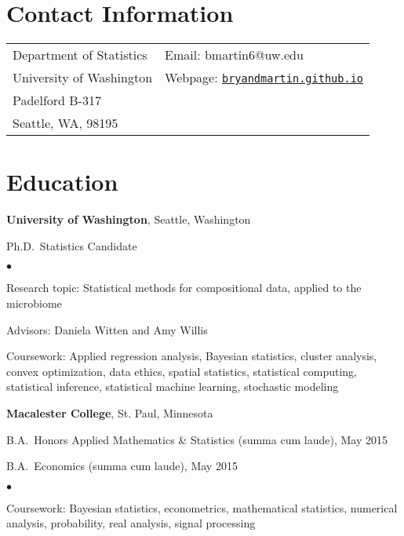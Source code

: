 \documentclass[margin,centered]{res}
\newenvironment{list1}{
  \begin{list}{\ding{113}}{%
      \setlength{\itemsep}{0in}
      \setlength{\parsep}{0in} \setlength{\parskip}{0in}
      \setlength{\topsep}{0in} \setlength{\partopsep}{0in}
      \setlength{\leftmargin}{0.17in}}}{\end{list}}
\newenvironment{list2}{
  \begin{list}{$\bullet$}{%
      \setlength{\itemsep}{0in}
      \setlength{\parsep}{0in} \setlength{\parskip}{0in}
      \setlength{\topsep}{0in} \setlength{\partopsep}{0in}
      \setlength{\leftmargin}{0.2in}}}{\end{list}}
\begin{document}
\vspace*{.1in}


\begin{resume}

\section{\sc Contact Information}

\vspace{.05in}
\begin{tabular}{@{}p{2.0in}p{2.9in}}
Department of Statistics& Email:  bmartin6@uw.edu \\
University of Washington  &Webpage: \href{https://bryandmartin.github.io/}{\texttt{bryandmartin.github.io}}
\\
Padelford B-317		                   	   \\
Seattle, WA, 98195             & \\






\end{tabular}

\section{\sc Education}
{\bf University of Washington}, Seattle, Washington
\begin{list1}
\item[] 
Ph.D.~Statistics Candidate
\begin{list2}
\vspace*{.05in}
\item Research topic: Statistical methods for compositional data, applied to the microbiome
\item Advisors: Daniela Witten and Amy Willis
\item Coursework: Applied regression analysis, Bayesian statistics, cluster analysis, convex optimization, data ethics, spatial statistics, statistical computing, statistical inference, statistical machine learning, stochastic modeling
\end{list2}
\end{list1}



{\bf Macalester College}, St. Paul, Minnesota
\begin{list1}
\item[] B.A.~Honors Applied Mathematics \& Statistics (summa cum laude), May 2015
\item[] B.A.~Economics (summa cum laude), May 2015
\begin{list2}
\vspace*{.05in}
\item Coursework: Bayesian statistics, econometrics, mathematical statistics, numerical analysis, probability, real analysis, signal processing
\end{list2}
\end{list1}



\end{resume}
\end{document}
